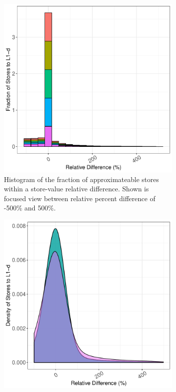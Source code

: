 \begin{figure}[htbp]
\begin{subfigure}{0.33\textwidth}
		\includegraphics[scale=0.4]{graphs/histogram_top5/narrow_hist.pdf}
		\caption{Histogram of the fraction of approximateable stores within a store-value relative difference. Shown is focused view between relative percent difference of -500\% and 500\%.}
	\end{subfigure}
	\begin{subfigure}{0.33\textwidth}
		\centering
		\includegraphics[scale=0.4]{graphs/histogram_top5/narrow_dist.pdf}

\end{subfigure}
\end{figure}
